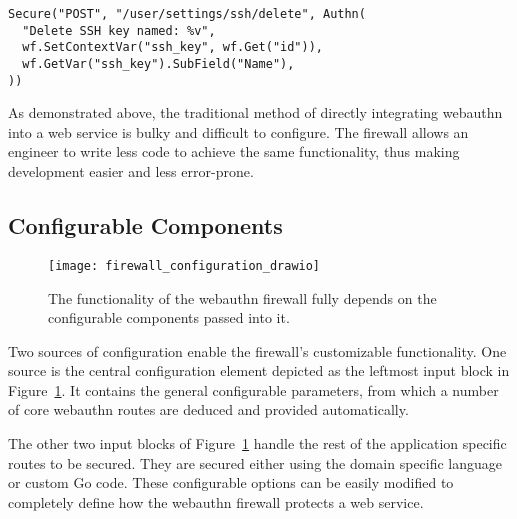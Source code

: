 


\begin{lstlisting}[float=h]
Secure("POST", "/user/settings/ssh/delete", Authn(
  "Delete SSH key named: %v",
  wf.SetContextVar("ssh_key", wf.Get("id")),
  wf.GetVar("ssh_key").SubField("Name"),
))
\end{lstlisting}

As demonstrated above, the traditional method of directly integrating webauthn into a web service is bulky and difficult to configure. The firewall allows an engineer to write less code to achieve the same functionality, thus making development easier and less error-prone.




\subsection{Configurable Components}

\begin{figure}[h]
  \centering
  \texttt{[image: firewall\_configuration\_drawio]}
  \caption{The functionality of the webauthn firewall fully depends on the configurable components passed into it.}\label{Fig:ConfigurableComponents}
\end{figure}

Two sources of configuration enable the firewall's customizable functionality. One source is the central configuration element depicted as the leftmost input block in Figure~\ref{Fig:ConfigurableComponents}. It contains the general configurable parameters, from which a number of core webauthn routes are deduced and provided automatically.

The other two input blocks of Figure~\ref{Fig:ConfigurableComponents} handle the rest of the application specific routes to be secured. They are secured either using the domain specific language or custom Go code. These configurable options can be easily modified to completely define how the webauthn firewall protects a web service. 

